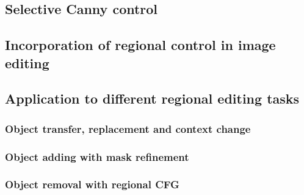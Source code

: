 \documentclass{article}
\begin{document}
\subsection{Selective Canny control}

\subsection{Incorporation of regional control in image editing}


\subsection{Application to different regional editing tasks}

\subsubsection{Object transfer, replacement and context change}





\subsubsection{Object adding with mask refinement}


\subsubsection{Object removal with regional CFG}
\end{document}
